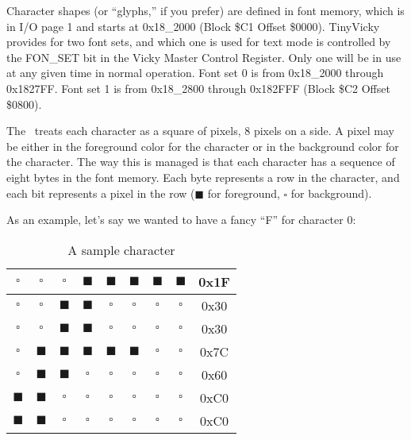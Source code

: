 Character shapes (or ``glyphs,'' if you prefer) are defined in font memory, which is in I/O page 1 and starts at 0x18\_2000 (Block \$C1 Offset \$0000). TinyVicky provides for two font sets, and which one is used for text mode is controlled by the FON\_SET bit in the Vicky Master Control Register. Only one will be in use at any given time in normal operation. Font set 0 is from 0x18\_2000 through 0x1827FF. Font set 1 is from 0x18\_2800 through 0x182FFF (Block \$C2 Offset \$0800).

The \jr\ treats each character as a square of pixels, 8 pixels on a side. A pixel may be either in the foreground color for the character or in the background color for the character. The way this is managed is that each character has a sequence of eight bytes in the font memory. Each byte represents a row in the character, and each bit represents a pixel in the row ($\blacksquare$ for foreground, $\square$ for background).

As an example, let's say we wanted to have a fancy ``F'' for character 0:

\begin{table}[ht]
    \begin{center}
        \begin{tabular}{|c|c|c|c|c|c|c|c|c|} \hline
            $\square$ & $\square$ & $\square$ & $\blacksquare$ & $\blacksquare$ & $\blacksquare$ & $\blacksquare$ & $\blacksquare$ & 0x1F \\ \hline
            $\square$ & $\square$ & $\blacksquare$ & $\blacksquare$ & $\square$ & $\square$ & $\square$ & $\square$ & 0x30 \\ \hline
            $\square$ & $\square$ & $\blacksquare$ & $\blacksquare$ & $\square$ & $\square$ & $\square$ & $\square$ & 0x30 \\ \hline
            $\square$ & $\blacksquare$ & $\blacksquare$ & $\blacksquare$ & $\blacksquare$ & $\blacksquare$ & $\square$ & $\square$ & 0x7C \\ \hline
            $\square$ & $\blacksquare$ & $\blacksquare$ & $\square$ & $\square$ & $\square$ & $\square$ & $\square$ & 0x60 \\ \hline
            $\blacksquare$ & $\blacksquare$ & $\square$ & $\square$ & $\square$ & $\square$ & $\square$ & $\square$ & 0xC0 \\ \hline
            $\blacksquare$ & $\blacksquare$ & $\square$ & $\square$ & $\square$ & $\square$ & $\square$ & $\square$ & 0xC0 \\ \hline
        \end{tabular}
    \end{center}
    \caption{A sample character}
    \label{tab:text_font}
\end{table}

